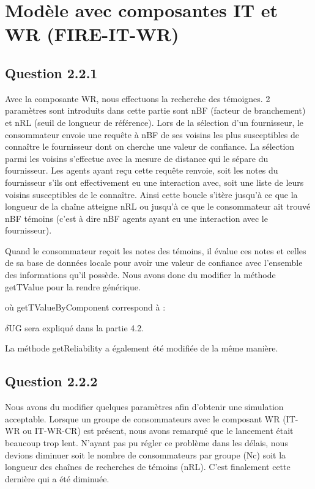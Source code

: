 
\section{Modèle avec composantes IT et WR (FIRE-IT-WR)}
\subsection{Question 2.2.1}
Avec la composante WR, nous effectuons la recherche des témoignes. 2 paramètres sont introduits dans cette partie sont nBF (facteur de branchement) et nRL (seuil de longueur de référence). Lors de la sélection d'un fournisseur, le consommateur envoie une requête à nBF de ses voisins les plus susceptibles de connaître le fournisseur dont on cherche une valeur de confiance. La sélection parmi les voisins s'effectue avec la mesure de distance qui le sépare du fournisseur. Les agents ayant reçu cette requête renvoie, soit les notes du fournisseur s'ils ont effectivement eu une interaction avec, soit une liste de leurs voisins susceptibles de le connaître. Ainsi cette boucle s'itère jusqu'à ce que la longueur de la chaîne atteigne nRL ou jusqu'à ce que le consommateur ait trouvé nBF témoins (c'est à dire nBF agents ayant eu une interaction avec le fournisseur).


Quand le consommateur reçoit les notes des témoins, il évalue ces notes et celles de sa base de données locale pour avoir une valeur de confiance avec l'ensemble des informations qu'il possède. Nous avons donc du modifier la méthode getTValue pour la rendre générique.

où getTValueByComponent correspond à :


$\delta$UG sera expliqué dans la partie 4.2.

La méthode getReliability a également été modifiée de la même manière.

\subsection{Question 2.2.2}
Nous avons du modifier quelques paramètres afin d'obtenir une simulation acceptable. Lorsque un groupe de consommateurs avec le composant WR (IT-WR ou IT-WR-CR) est présent, nous avons remarqué que le lancement était beaucoup trop lent. N'ayant pas pu régler ce problème dans les délais, nous devions diminuer soit le nombre de consommateurs par groupe (Nc) soit la longueur des chaînes de recherches de témoins (nRL). C'est finalement cette dernière qui a été diminuée. 

